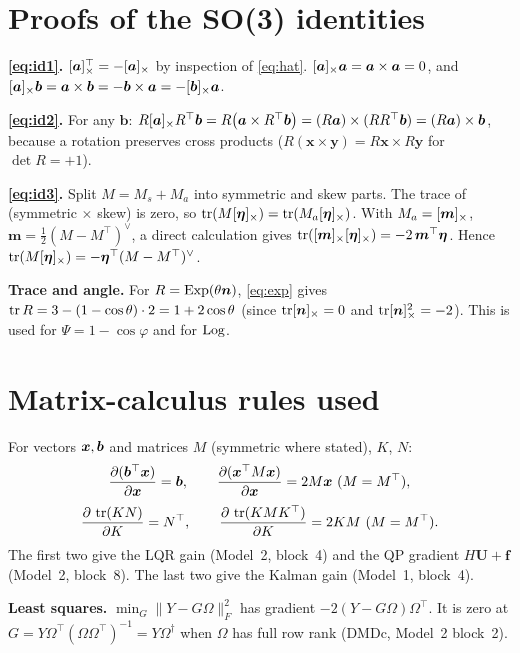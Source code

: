 \section{Proofs of the SO(3) identities}
\label{app:so3}

\textbf{\eqref{eq:id1}.} $[\bm a]_{\times}^\top=-[\bm a]_{\times}$ by inspection of \eqref{eq:hat}. $[\bm a]_{\times}\bm a=\bm a\times\bm a=0$, and
$[\bm a]_{\times}\bm b=\bm a\times\bm b=-\bm b\times\bm a=-[\bm b]_{\times}\bm a$.

\textbf{\eqref{eq:id2}.} For any $\bm b$: $R[\bm a]_{\times}R^\top\bm b=R\big(\bm a\times R^\top\bm b\big)=(R\bm a)\times(RR^\top\bm b)=(R\bm a)\times\bm b$,
because a rotation preserves cross products ($R(\bm x\times\bm y)=R\bm x\times R\bm y$ for $\det R=+1$).

\textbf{\eqref{eq:id3}.} Split $M=M_s+M_a$ into symmetric and skew parts. The trace of (symmetric $\times$ skew) is zero, so
$\operatorname{tr}(M[\bm\eta]_{\times})=\operatorname{tr}(M_a[\bm\eta]_{\times})$. With $M_a=[\bm m]_{\times}$, $\bm m=\tfrac12(M-M^\top)^\vee$, a direct calculation gives
$\operatorname{tr}([\bm m]_{\times}[\bm\eta]_{\times})=-2\,\bm m^\top\bm\eta$. Hence $\operatorname{tr}(M[\bm\eta]_{\times})=-\bm\eta^\top(M-M^\top)^\vee$.

\textbf{Trace and angle.} For $R=\mathrm{Exp}(\theta\bm n)$, \eqref{eq:exp} gives $\operatorname{tr} R=3-(1-\cos\theta)\cdot2=1+2\cos\theta$ (since
$\operatorname{tr}[\bm n]_{\times}=0$ and $\operatorname{tr}[\bm n]_{\times}^2=-2$). This is used for $\Psi=1-\cos\varphi$ and for $\mathrm{Log}$.

\section{Matrix-calculus rules used}
\label{app:calc}

For vectors $\bm{x},\bm b$ and matrices $M$ (symmetric where stated), $K$, $N$:
\[
\frac{\partial(\bm b^\top\bm{x})}{\partial\bm{x}}=\bm b,\qquad
\frac{\partial(\bm{x}^\top M\bm{x})}{\partial\bm{x}}=2M\bm{x}\ (M=M^\top),
\]
\[
\frac{\partial\,\operatorname{tr}(KN)}{\partial K}=N^\top,\qquad
\frac{\partial\,\operatorname{tr}(KMK^\top)}{\partial K}=2KM\ (M=M^\top).
\]
The first two give the LQR gain (Model~2, block~4) and the QP gradient $H\mathbf U+\bm f$ (Model~2, block~8). The last two give the
Kalman gain (Model~1, block~4).

\textbf{Least squares.} $\min_G\|Y-G\Omega\|_F^2$ has gradient $-2(Y-G\Omega)\Omega^\top$. It is zero at
$G=Y\Omega^\top(\Omega\Omega^\top)^{-1}=Y\Omega^\dagger$ when $\Omega$ has full row rank (DMDc, Model~2 block~2).

